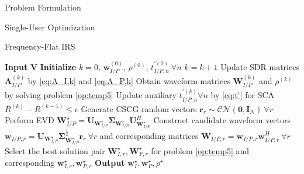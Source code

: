 \documentclass{IEEEtran}
\begin{document}
\begin{section}{Problem Formulation}
\begin{subsection}{Single-User Optimization}
\begin{subsubsection}{Frequency-Flat IRS}
			\begin{algorithm}
				\caption{Waveform Optimization}
				\label{alg:waveform}
				\begin{algorithmic}[1]
					\State \textbf{Input} $\boldsymbol{V}$
					\State \textbf{Initialize} $k=0$, $\boldsymbol{w}_{I/P}^{(0)}$, $\rho^{(0)}$, $t_{I/P,n}^{\prime (0)} \ \forall n$
					\Repeat
					\State $k = k + 1$
					\State Update SDR matrices $\boldsymbol{A}_{I/P}^{(k)}$ by \ref{eq:A_I,k} and \ref{eq:A_P,k}
					\State Obtain waveform matrices $\boldsymbol{W}_{I/P}^{(k)}$ and $\rho^{(k)}$ by solving problem \ref{op:temp5}
					\State Update auxiliary $t_{I/P,n}^{\prime (k)} \forall n$ by \ref{eq:t'} for SCA
					\Until $R^{(k)}-R^{(k-1)} \le \epsilon$
					\State Generate CSCG random vectors $\boldsymbol{r}_r \sim \mathcal{CN}(\boldsymbol{0},\boldsymbol{I}_{N}) \ \forall r$
					\State Perform EVD $\boldsymbol{W}_{I/P}^{\star}=\boldsymbol{U}_{\boldsymbol{W}_{I/P}^{\star}}\boldsymbol{\Sigma}_{\boldsymbol{W}_{I/P}^{\star}}\boldsymbol{U}_{\boldsymbol{W}_{I/P}^{\star}}^H$
					\State Construct candidate waveform vectors $\boldsymbol{w}_{I/P,r}=\boldsymbol{U}_{\boldsymbol{W}_{I/P}^{\star}}\boldsymbol{\Sigma}_{\boldsymbol{W}_{I/P}^{\star}}^{\frac{1}{2}}\boldsymbol{r}_r \ \forall r$ and corresponding matrices $\boldsymbol{W}_{I/P,r}=\boldsymbol{w}_{I/P,r}\boldsymbol{w}_{I/P,r}^H  \ \forall r$
					\State Select the best solution pair $\boldsymbol{W}_{I,r}^\star, \boldsymbol{W}_{P,r}^\star$ for problem \ref{op:temp5} and corresponding $\boldsymbol{w}_{I,r}^\star, \boldsymbol{w}_{P,r}^\star$
					\State \textbf{Output} $\boldsymbol{w}_I^\star, \boldsymbol{w}_P^\star, \rho^\star$
				\end{algorithmic}
			\end{algorithm}




\end{subsubsection}
\end{subsection}
\end{section}
\end{document}
